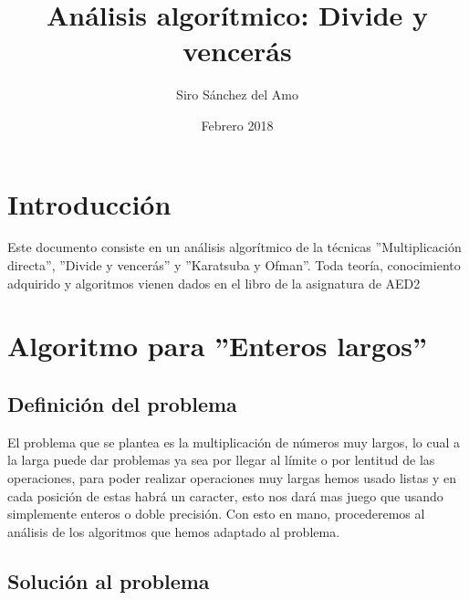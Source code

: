 \documentclass{article}
\title{\fuente Análisis algorítmico: Divide y vencerás}
\author{Siro Sánchez del Amo}
\date{Febrero 2018}
\begin{document}
\begin{titlingpage}
\vfill 
\maketitle

\par
{}%
\hfill
{}%
\par

\thispagestyle{empty}
\end{titlingpage}
\newpage

\tableofcontents
\thispagestyle{fancy}
\newpage

\section{Introducción}
Este documento consiste en un análisis algorítmico de la técnicas ''Multiplicación directa'', ''Divide y vencerás'' y ''Karatsuba y Ofman''. Toda teoría, conocimiento adquirido y algoritmos vienen dados en el libro de la asignatura de AED2 \cite{AED2}

\section{Algoritmo para ''Enteros largos''}
\subsection{Definición del problema}
El problema que se plantea es la multiplicación de números muy largos, lo cual a la larga puede dar problemas ya sea por llegar al límite o por lentitud de las operaciones, para poder realizar operaciones muy largas hemos usado listas y en cada posición de estas habrá un caracter, esto nos dará mas juego que usando simplemente enteros o doble precisión. Con esto en mano, procederemos al análisis de los algoritmos que hemos adaptado al problema.

\subsection{Solución al problema}
\end{document}
